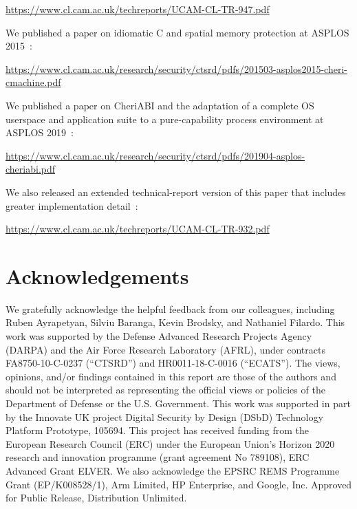 \documentclass[12pt,twoside,openright,a4paper]{article}
\newcommand{\note}[2]{{\color{blue}[ Note: #1 - #2]}}
\renewcommand{\note}[2]{\relax\ifhmode\unskip\fi}
\newcommand{\rwnote}[1]{\note{#1}{Robert W.}}
\begin{document}
\smallskip
\noindent
\url{https://www.cl.cam.ac.uk/techreports/UCAM-CL-TR-947.pdf}
\smallskip

\noindent
We published a paper on idiomatic C and spatial memory protection at ASPLOS
2015~\cite{ChisnallCPDP11}:

\smallskip
\noindent
\url{https://www.cl.cam.ac.uk/research/security/ctsrd/pdfs/201503-asplos2015-cheri-cmachine.pdf}
\smallskip

\noindent
We published a paper on CheriABI and the adaptation of a complete OS userspace
and application suite to a pure-capability process environment at ASPLOS
2019~\cite{davis2019:cheriabi}:

\smallskip
\noindent
\url{https://www.cl.cam.ac.uk/research/security/ctsrd/pdfs/201904-asplos-cheriabi.pdf}
\smallskip

\noindent
We also released an extended technical-report version of this paper that
includes greater implementation detail~\cite{UCAM-CL-TR-932}:

\smallskip
\noindent
\url{https://www.cl.cam.ac.uk/techreports/UCAM-CL-TR-932.pdf}
\smallskip

\section{Acknowledgements}

\rwnote{Update feedback acknowledgments here.}

\rwnote{Add authors of CHERI C/C++ Programming Guide who don't end up being
  authors on this document.}

We gratefully acknowledge the helpful feedback from our colleagues, including
Ruben Ayrapetyan, Silviu Baranga, Kevin Brodsky, and Nathaniel Filardo.
This work was supported by the Defense Advanced Research Projects Agency (DARPA) and the Air Force Research Laboratory (AFRL), under contracts
FA8750-10-C-0237 (``CTSRD'') and HR0011-18-C-0016 (``ECATS'').
The views, opinions, and/or findings contained in this report are those of the authors and should not be interpreted as representing the official views or policies of the Department of Defense or the U.S. Government.
This work was supported in part by the Innovate UK project Digital Security by
Design (DSbD) Technology Platform Prototype, 105694.
This project has received funding from the European Research Council
(ERC) under the European Union's Horizon 2020 research and innovation programme (grant agreement No 789108), ERC Advanced Grant ELVER.
We also acknowledge the EPSRC REMS Programme Grant (EP/K008528/1), Arm Limited,
HP Enterprise, and Google, Inc.
Approved for Public Release, Distribution Unlimited.

\printbibliography
\end{document}
